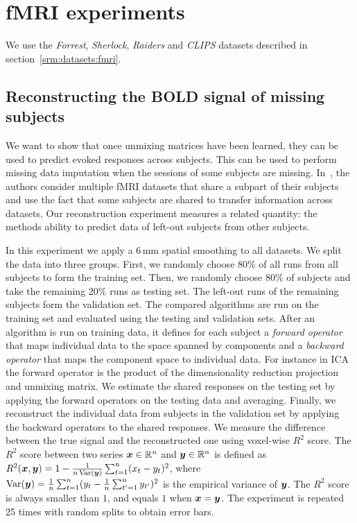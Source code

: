 \section{fMRI experiments}
We use the \emph{Forrest}, \emph{Sherlock}, \emph{Raiders} and \emph{CLIPS} datasets described in section~\ref{srm:datasets:fmri}.

\subsection{Reconstructing the BOLD signal of missing subjects}
\label{sec:srm:reconstruction}
\label{reconstruction}
We want to show that once unmixing matrices have been learned, they can be
used to predict evoked responses across subjects. This can be used to perform
missing data imputation when the sessions of some subjects are missing.
In~\cite{zhang2018transfer}, the authors consider multiple fMRI datasets that
share a subpart of their subjects and use the fact that some subjects are shared
to transfer information across datasets. Our reconstruction experiment measures
a related quantity: the methods ability to predict data of left-out subjects
from other subjects.

In this experiment we apply a 6\,mm spatial smoothing to all datasets. 
We split the data into three groups. First, we randomly choose $80\%$ of all runs from all subjects to form the training set.
%
Then, we randomly choose $80\%$ of subjects and take the remaining $20\%$  runs as testing set.
%
The left-out runs  of the remaining subjects form the validation set.
%
The compared algorithms are run on the training set and evaluated using the testing and validation sets.
%
After an algorithm is run on training data, it defines for each subject a \emph{forward operator} that maps individual data to the space spanned by components and a \emph{backward operator} that maps the component space to individual data. For instance in ICA the forward operator is the product of the dimensionality reduction projection and unmixing matrix.
%
We estimate the shared responses on the testing set by applying the forward operators on the testing data and averaging. Finally, we reconstruct the individual data from subjects in the validation set by applying the backward operators to the shared responses. We measure the difference between the true signal and the reconstructed one using voxel-wise $R^2$ score. The $R^2$ score between two series $\boldsymbol{x} \in \mathbb{R}^n$ and $\boldsymbol{y} \in \mathbb{R}^n$ is defined as
$R^2(\boldsymbol{x}, \boldsymbol{y}) = 1 - \frac1{n\operatorname*{Var}(\boldsymbol{y})}\sum_{t=1}^n (x_t - y_t)^2$, where $\operatorname*{Var}(\boldsymbol{y}) = \frac1n\sum_{t=1}^n (y_t - \frac1n \sum_{t'=1}^n y_{t'})^2$ is the empirical variance of $\boldsymbol{y}$.
%
The $R^2$ score is always smaller than $1$, and equals $1$ when $\boldsymbol{x}= \boldsymbol{y}$.
The experiment is repeated 25 times with random splits to obtain error bars.


